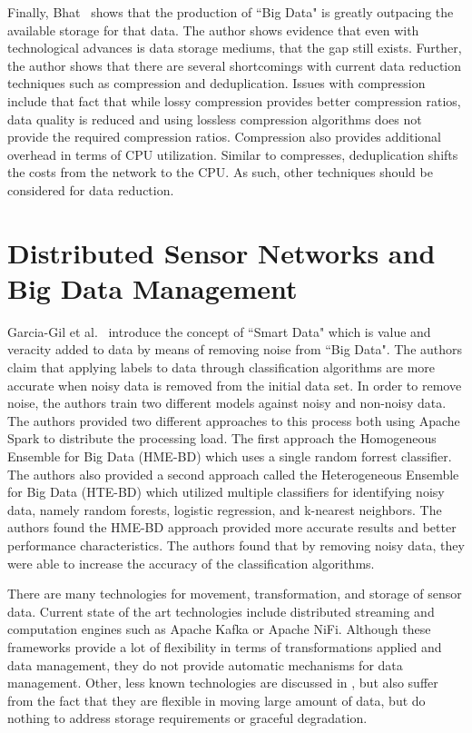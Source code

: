 Finally, Bhat~\cite{bhat2018data} shows that the production of ``Big Data" is greatly outpacing the available storage for that data. The author shows evidence that even with technological advances is data storage mediums, that the gap still exists. Further, the author shows that there are several shortcomings with current data reduction techniques such as compression and deduplication. Issues with compression include that fact that while lossy compression provides better compression ratios, data quality is reduced and using lossless compression algorithms does not provide the required compression ratios. Compression also provides additional overhead in terms of CPU utilization. Similar to compresses, deduplication shifts the costs from the network to the CPU. As such, other techniques should be considered for data reduction.

\section{Distributed Sensor Networks and Big Data Management}\label{sec:distributed-sensor-networks-and-big-data-management}

Garcia-Gil et al.~\cite{garcia2019enabling} introduce the concept of ``Smart Data" which is value and veracity added to data by means of removing noise from ``Big Data". The authors claim that applying labels to data through classification algorithms are more accurate when noisy data is removed from the initial data set. In order to remove noise, the authors train two different models against noisy and non-noisy data. The authors provided two different approaches to this process both using Apache Spark to distribute the processing load. The first approach the Homogeneous Ensemble for Big Data (HME-BD) which uses a single random forrest classifier. The authors also provided a second approach called the Heterogeneous Ensemble for Big Data (HTE-BD) which utilized multiple classifiers for identifying noisy data, namely random forests, logistic regression, and k-nearest neighbors. The authors found the HME-BD approach provided more accurate results and better performance characteristics.  The authors found that by removing noisy data, they were able to increase the accuracy of the classification algorithms.

There are many technologies for movement, transformation, and storage of sensor data. Current state of the art technologies include distributed streaming and computation engines such as Apache Kafka\cite{kreps2011kafka} or Apache NiFi\cite{noauthor_apache_nodate}. Although these frameworks provide a lot of flexibility in terms of transformations applied and data management, they do not provide automatic mechanisms for data management. Other, less known technologies are discussed in \cite{hughes2016survey}, but also suffer from the fact that they are flexible in moving large amount of data, but do nothing to address storage requirements or graceful degradation.

